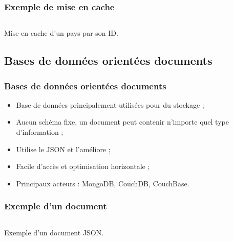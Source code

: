 	\begin{frame}
		\frametitle{Exemple de mise en cache}

		\begin{listing}[H]
			\inputminted[fontsize=\tiny, linenos=true]{php}{code/cacheRepository.php}
			\caption{Mise en cache d'un pays par son ID.}
		\end{listing}

	\end{frame}

	\subsection{Bases de données orientées documents}
	\begin{frame}
		\frametitle{Bases de données orientées documents}

		\begin{itemize}
			\item Base de données principalement utilisées pour du stockage ;
			\item Aucun schéma fixe, un document peut contenir n'importe quel type d'information ;
			\item Utilise le JSON et l'améliore ;
			\item Facile d'accès et optimisation horizontale ;
			\item Principaux acteurs : MongoDB, CouchDB, CouchBase.
		\end{itemize}

	\end{frame}

	\begin{frame}
		\frametitle{Exemple d'un document}

		\begin{listing}[H]
			\inputminted[fontsize=\tiny, linenos=true]{json}{code/exemple-document.json}
			\caption{Exemple d'un document JSON.}
		\end{listing}


	\end{frame}


